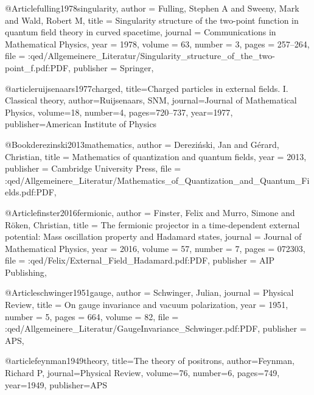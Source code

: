 @Article{fulling1978singularity,
  author    = {Fulling, Stephen A and Sweeny, Mark and Wald, Robert M},
  title     = {Singularity structure of the two-point function in quantum field theory in curved spacetime},
  journal   = {Communications in Mathematical Physics},
  year      = {1978},
  volume    = {63},
  number    = {3},
  pages     = {257--264},
  file      = {:qed/Allgemeinere_Literatur/Singularity_structure_of_the_two-point_f.pdf:PDF},
  publisher = {Springer},
}


@article{ruijsenaars1977charged,
  title={Charged particles in external fields. I. Classical theory},
  author={Ruijsenaars, SNM},
  journal={Journal of Mathematical Physics},
  volume={18},
  number={4},
  pages={720--737},
  year={1977},
  publisher={American Institute of Physics}
}


@Book{derezinski2013mathematics,
  author    = {Derezi{\'n}ski, Jan and G{\'e}rard, Christian},
  title     = {Mathematics of quantization and quantum fields},
  year      = {2013},
  publisher = {Cambridge University Press},
  file      = {:qed/Allgemeinere_Literatur/Mathematics_of_Quantization_and_Quantum_Fields.pdf:PDF},
}


@Article{finster2016fermionic,
  author    = {Finster, Felix and Murro, Simone and R{\"o}ken, Christian},
  title     = {The fermionic projector in a time-dependent external potential: Mass oscillation property and Hadamard states},
  journal   = {Journal of Mathematical Physics},
  year      = {2016},
  volume    = {57},
  number    = {7},
  pages     = {072303},
  file      = {:qed/Felix/External_Field_Hadamard.pdf:PDF},
  publisher = {AIP Publishing},
}



@Article{schwinger1951gauge,
  author    = {Schwinger, Julian},
  journal   = {Physical Review},
  title     = {On gauge invariance and vacuum polarization},
  year      = {1951},
  number    = {5},
  pages     = {664},
  volume    = {82},
  file      = {:qed/Allgemeinere_Literatur/GaugeInvariance_Schwinger.pdf:PDF},
  publisher = {APS},
}


@article{feynman1949theory,
  title={The theory of positrons},
  author={Feynman, Richard P},
  journal={Physical Review},
  volume={76},
  number={6},
  pages={749},
  year={1949},
  publisher={APS}
}

